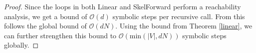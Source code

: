 \documentclass[../master/master.tex]{subfiles}
\begin{document}
\begin{proof}
  Since the loops in both Linear and SkelForward perform a reachability analysis, we get a bound of $\mathcal{O}(d)$ symbolic steps per recursive call. From this follows the global bound of $\mathcal{O}(dN)$. Using the bound from Theorem \ref{linear}, we can further strengthen this bound to $\mathcal{O}(\text{min}(|V|, dN))$ symbolic steps globally.
\end{proof}
\end{document}
